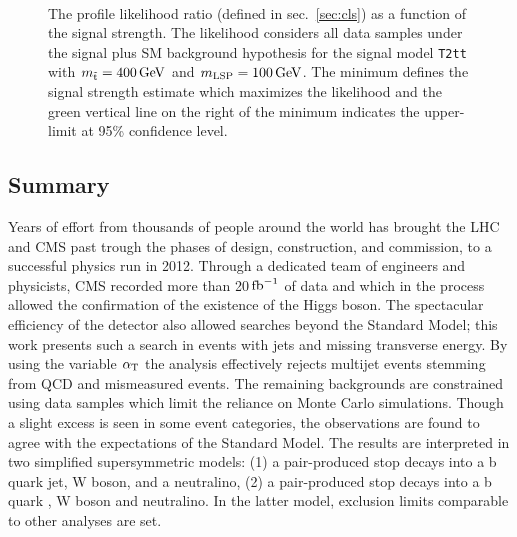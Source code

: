 \begin{figure}[t!]
  \begin{center}
     \\
    \caption{\label{fig:t2tt-int-400_100}The profile likelihood ratio 
      (defined in sec.~\ref{sec:cls}) as a function of the signal strength.
      The likelihood considers all data samples under the signal plus SM 
      background hypothesis for the signal model \texttt{T2tt} with 
      $m_{\tilde{\rm t}} = 400\,\text{Ge\hspace{-.08em}V}$ and $m_{\text{LSP}} = 100\,\text{Ge\hspace{-.08em}V}$.
      The minimum defines the signal strength estimate which maximizes the
      likelihood and the green vertical line on the right of the minimum 
      indicates the upper-limit at 95\% confidence level.}
  \end{center}
\end{figure}

\subsection{Summary}

Years of effort from thousands of people around the world
has brought the LHC and CMS past trough the phases of design, construction,
and commission, to a successful physics run in 2012. Through a dedicated
team of engineers and physicists, CMS recorded more than 20$\mbox{\ensuremath{\,\text{fb}^\text{$-$1}}}$ of data and 
which in the process allowed the confirmation of the existence of the Higgs boson. 
The spectacular efficiency of the detector also allowed
searches beyond the Standard Model; this work presents such a search
in events with jets and missing transverse energy. By using the variable $\alpha_{\text{T}}$
the analysis effectively rejects multijet events stemming from QCD and 
mismeasured events. The remaining backgrounds are constrained using
data samples which limit the reliance on Monte Carlo simulations. Though
a slight excess is seen in some event categories, the observations are found 
to agree with the expectations of the Standard Model. The results are interpreted
in two simplified supersymmetric models: (1) a pair-produced stop decays into a b quark 
jet, W boson, and a neutralino, (2) a pair-produced stop decays into a b quark 
, W boson and neutralino.  In the latter model, exclusion limits comparable to other 
analyses are set. 

